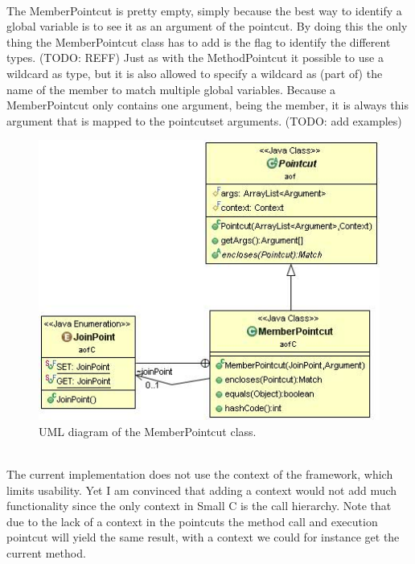 \documentclass[a4paper]{report}
\begin{document}
\\
The MemberPointcut is pretty empty, simply because the best way to identify a global variable is to see it as an argument of the pointcut. By doing this the only thing the MemberPointcut class has to add is the flag to identify the different types. (TODO: REFF) Just as with the MethodPointcut it possible to use a wildcard as type, but it is also allowed to specify a wildcard as (part of) the name of the member to match multiple global variables. Because a MemberPointcut only contains one argument, being the member, it is always this argument that is mapped to the pointcutset arguments. (TODO: add examples)\\
\begin{figure}
\centering
\includegraphics[scale=0.7]{images/AOFC/MemberPointcut.jpg}
\caption{UML diagram of the MemberPointcut class.}
\label{fig:MemberPointcut}
\end{figure}
\\
The current implementation does not use the context of the framework, which limits usability. Yet I am convinced that adding a context would not add much functionality since the only context in Small C is the call hierarchy. Note that due to the lack of a context in the pointcuts the method call and execution pointcut will yield the same result, with a context we could for instance get the current method.
\end{document}
